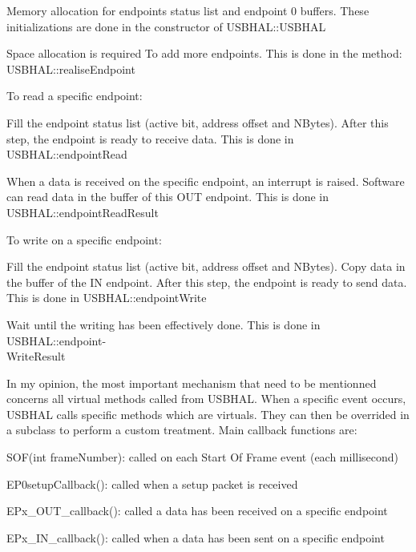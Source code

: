 \documentclass[pdftex,10pt,a4paper]{report}
\newenvironment{packed_item}{
\begin{itemize}
  \setlength{\itemsep}{1pt}
  \setlength{\parskip}{0pt}
  \setlength{\parsep}{0pt}
}{\end{itemize}}
\begin{document}
\begin{packed_item}
	\item Memory allocation for endpoints status list and endpoint 0 buffers. These initializations are done in the constructor of USBHAL::USBHAL
	\item Space allocation is required To add more endpoints. This is done in the method: USBHAL::realiseEndpoint
	\item To read a specific endpoint:
		\begin{packed_item}
			\item Fill the endpoint status list (active bit, address offset and NBytes). After this step, the endpoint is ready to receive data. This is done in USBHAL::endpointRead
			\item When a data is received on the specific endpoint, an interrupt is raised. Software can read data in the buffer of this OUT endpoint. This is done in USBHAL::endpointReadResult
		\end{packed_item}
	\item To write on a specific endpoint:
		\begin{packed_item}
			\item Fill the endpoint status list (active bit, address offset and NBytes). Copy data in the buffer of the IN endpoint. After this step, the endpoint is ready to send data. This is done in USBHAL::endpointWrite
			\item Wait until the writing has been effectively done. This is done in USBHAL::endpoint-\\WriteResult
		\end{packed_item}
\end{packed_item}


In my opinion, the most important mechanism that need to be mentionned concerns all virtual methods called from USBHAL. When a specific event occurs, USBHAL calls specific methods which are virtuals. They can then be overrided in a subclass to perform a custom treatment. Main callback functions are:
\begin{packed_item}
	\item SOF(int frameNumber): called on each Start Of Frame event (each millisecond)
	\item EP0setupCallback(): called when a setup packet is received
	\item EPx\_OUT\_callback(): called a data has been received on a specific endpoint
	\item EPx\_IN\_callback(): called when a data has been sent on a specific endpoint
\end{packed_item}
\end{document}
